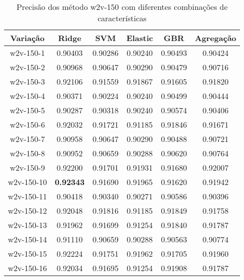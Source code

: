 \begin{table}[H]
\label{tab:precisionw2v150vars}
\centering
\begin{tabular}{|c| c c  c  c  c| }
\hline
Variação &  Ridge & SVM & Elastic & GBR & Agregação  \\ 
\hline
w2v-150-1 & 0.90403 & 0.90286 & 0.90240 & 0.90493 & 0.90424 \\
\hline
w2v-150-2 & 0.90968 & 0.90647 & 0.90290 & 0.90479 & 0.90716 \\
\hline
w2v-150-3 & 0.92106 & 0.91559 & 0.91867 & 0.91605 & 0.91820 \\
\hline
w2v-150-4 & 0.90371 & 0.90224 & 0.90240 & 0.90499 & 0.90444 \\
\hline
w2v-150-5 & 0.90287 & 0.90318 & 0.90240 & 0.90574 & 0.90406 \\
\hline
w2v-150-6 & 0.92032 & 0.91721 & 0.91185 & 0.91846 & 0.91671 \\
\hline
w2v-150-7 & 0.90958 & 0.90647 & 0.90290 & 0.90488 & 0.90721 \\
\hline
w2v-150-8 & 0.90952 & 0.90659 & 0.90288 & 0.90620 & 0.90764 \\
\hline
w2v-150-9 & 0.92200 & 0.91701 & 0.91931 & 0.91680 & 0.92007 \\
\hline
w2v-150-10 & \textbf{0.92343} & 0.91690 & 0.91965 & 0.91620 & 0.91942 \\
\hline
w2v-150-11 & 0.90418 & 0.90340 & 0.90271 & 0.90586 & 0.90396 \\
\hline
w2v-150-12 & 0.92048 & 0.91816 & 0.91185 & 0.91849 & 0.91758 \\
\hline
w2v-150-13 & 0.91962 & 0.91699 & 0.91254 & 0.91840 & 0.91787 \\
\hline
w2v-150-14 & 0.91110 & 0.90659 & 0.90288 & 0.90563 & 0.90774 \\
\hline
w2v-150-15 & 0.92224 & 0.91751 & 0.91962 & 0.91705 & 0.91960 \\
\hline
w2v-150-16 & 0.92034 & 0.91695 & 0.91254 & 0.91908 & 0.91787 \\
\hline
\end{tabular}
\caption{Precisão dos método w2v-150 com diferentes combinações de características}
\end{table}

